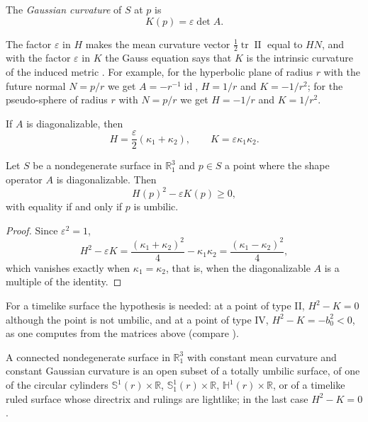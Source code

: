 \begin{definition}
\label{definition-palmas-gauss-curvature}
The \emph{Gaussian curvature} of $S$ at $p$
is
$$
K(p)=\varepsilon\det A.
$$
\end{definition}

The factor $\varepsilon$ in $H$ makes the
mean curvature vector
$\tfrac12\operatorname{tr}\operatorname{II}$
equal to $HN$, and with the factor
$\varepsilon$ in $K$ the Gauss equation
says that $K$ is the intrinsic curvature of
the induced metric \cite[Section
3.2]{lopez2014differential}. For example,
for the hyperbolic plane of radius $r$ with
the future normal $N=p/r$ we get $A=-r^{-1}
\operatorname{id}$, $H=1/r$ and
$K=-1/r^2$; for the pseudo-sphere of radius
$r$ with $N=p/r$ we get $H=-1/r$ and
$K=1/r^2$.

\begin{remark}
\label{remark-palmas-principal-curvatures}
If $A$ is diagonalizable, then
$$
H=\frac{\varepsilon}{2}(\kappa_1+\kappa_2),
\qquad
K=\varepsilon\kappa_1\kappa_2.
$$
\end{remark}

\begin{proposition}
\label{proposition-palmas-h2-minus-k}
Let $S$ be a nondegenerate surface in
$\mathbb{R}^3_1$ and $p\in S$ a point where
the shape operator $A$ is diagonalizable.
Then
$$
H(p)^2-\varepsilon K(p)\geq 0,
$$
with equality if and only if $p$ is
umbilic.
\end{proposition}

\begin{proof}
Since $\varepsilon^2=1$,
$$
H^2-\varepsilon K
=\frac{(\kappa_1+\kappa_2)^2}{4}
-\kappa_1\kappa_2
=\frac{(\kappa_1-\kappa_2)^2}{4},
$$
which vanishes exactly when
$\kappa_1=\kappa_2$, that is, when the
diagonalizable $A$ is a multiple of the
identity.
\end{proof}

For a timelike surface the hypothesis is
needed: at a point of type II,
$H^2-K=0$ although the point is not
umbilic, and at a point of type IV,
$H^2-K=-b_0^2<0$, as one computes from the
matrices above (compare
\cite[Proposition 3.4]{%
lopez2014differential}).

\begin{theorem}[López, 2014]
\label{theorem-palmas-lopez-constant-hk}
A connected nondegenerate surface in
$\mathbb{R}^3_1$ with constant mean
curvature and constant Gaussian curvature
is an open subset of a totally umbilic
surface, of one of the circular cylinders
$\mathbb{S}^1(r)\times\mathbb{R}$,
$\mathbb{S}^1_1(r)\times\mathbb{R}$,
$\mathbb{H}^1(r)\times\mathbb{R}$, or of a
timelike ruled
surface whose directrix and rulings are
lightlike; in the last case $H^2-K=0$.
\end{theorem}

